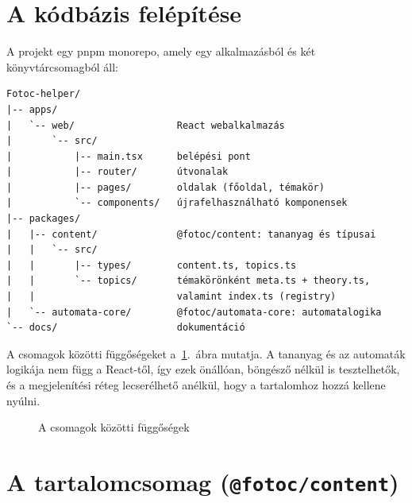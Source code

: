 \documentclass[12pt,a4paper]{report}
\begin{document}
\section{A kódbázis felépítése}

A projekt egy pnpm monorepo, amely egy alkalmazásból és két
könyvtárcsomagból áll:

\begin{verbatim}
Fotoc-helper/
|-- apps/
|   `-- web/                  React webalkalmazás
|       `-- src/
|           |-- main.tsx      belépési pont
|           |-- router/       útvonalak
|           |-- pages/        oldalak (főoldal, témakör)
|           `-- components/   újrafelhasználható komponensek
|-- packages/
|   |-- content/              @fotoc/content: tananyag és típusai
|   |   `-- src/
|   |       |-- types/        content.ts, topics.ts
|   |       `-- topics/       témakörönként meta.ts + theory.ts,
|   |                         valamint index.ts (registry)
|   `-- automata-core/        @fotoc/automata-core: automatalogika
`-- docs/                     dokumentáció
\end{verbatim}

A csomagok közötti függőségeket a~\ref{fig:packages}.~ábra mutatja.
A tananyag és az automaták logikája nem függ a React-től, így ezek
önállóan, böngésző nélkül is tesztelhetők, és a megjelenítési réteg
lecserélhető anélkül, hogy a tartalomhoz hozzá kellene nyúlni.

\begin{figure}[htbp]
    \centering
    \caption{A csomagok közötti függőségek}
    \label{fig:packages}
\end{figure}

\section{A tartalomcsomag (\texttt{@fotoc/content})}
\end{document}
